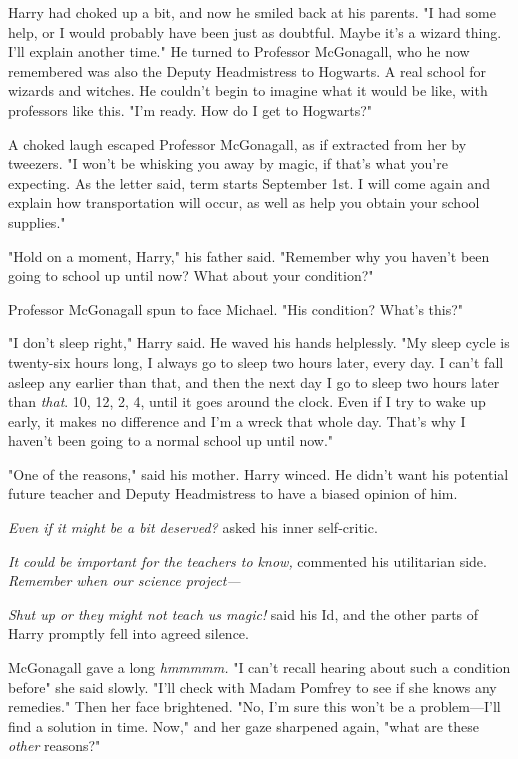 Harry had choked up a bit, and now he smiled back at his
parents. "I had some help, or I would probably have been
just as doubtful. Maybe it's a wizard thing. I'll explain
another time." He turned to Professor McGonagall, who he
now remembered was also the Deputy Headmistress to
Hogwarts. A real school for wizards and witches. He
couldn't begin to imagine what it would be like, with
professors like this. "I'm ready. How do I get to Hogwarts?"

A choked laugh escaped Professor McGonagall, as if extracted from her by
tweezers. "I won't be whisking you away by
magic, if that's what you're expecting. As the letter said,
term starts September 1st. I will come again and explain
how transportation will occur, as well as help you obtain
your school supplies."

"Hold on a moment, Harry," his father said. "Remember why you haven't been
going to school up until now? What about your condition?"

Professor McGonagall spun to face Michael. "His condition? What's this?"

"I don't sleep right," Harry said. He waved his hands helplessly. "My sleep
cycle is twenty-six hours long, I always go to sleep two hours later, every
day. I can't fall asleep any earlier than that, and then the next day I go to
sleep two hours later than \emph{that}. 10\PM, 12\AM, 2\AM, 4\AM, until it goes
around the clock. Even if I try to wake up early, it makes no difference and
I'm a wreck that whole day. That's why I haven't been going to a normal school
up until now."

"One of the reasons," said his mother. Harry winced. He
didn't want his potential future teacher and Deputy
Headmistress to have a biased opinion of him.

\emph{Even if it might be a bit deserved?} asked his inner self-critic.

\emph{It could be important for the teachers to know,}
commented his utilitarian side. \emph{Remember when our science project—}

\emph{Shut up or they might not teach us magic!} said his Id,
and the other parts of Harry promptly fell into agreed silence.

McGonagall gave a long \emph{hmmmmm.} "I can't recall hearing about such a
condition before{\el}" she said slowly. "I'll check with Madam Pomfrey to
see if she knows any remedies." Then her face brightened. "No, I'm sure this
won't be a problem—I'll find a solution in time. Now," and her gaze sharpened
again, "what are these \emph{other} reasons?"

